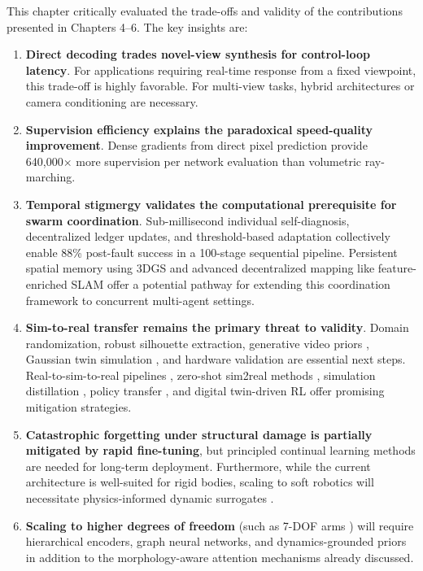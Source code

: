 \documentclass[12pt,a4paper,oneside]{report}
\begin{document}
This chapter critically evaluated the trade-offs and validity of the contributions presented in Chapters 4–6. The key insights are:

\begin{enumerate}
    \item \textbf{Direct decoding trades novel-view synthesis for control-loop latency}. For applications requiring real-time response from a fixed viewpoint, this trade-off is highly favorable. For multi-view tasks, hybrid architectures or camera conditioning are necessary.
    
    \item \textbf{Supervision efficiency explains the paradoxical speed-quality improvement}. Dense gradients from direct pixel prediction provide 640,000× more supervision per network evaluation than volumetric ray-marching.
    
    \item \textbf{Temporal stigmergy validates the computational prerequisite for swarm coordination}. Sub-millisecond individual self-diagnosis, decentralized ledger updates, and threshold-based adaptation collectively enable 88\% post-fault success in a 100-stage sequential pipeline. Persistent spatial memory using 3DGS \cite{lu2025gsmem} and advanced decentralized mapping like feature-enriched SLAM \cite{thirgood2025featureslam} offer a potential pathway for extending this coordination framework to concurrent multi-agent settings.
    
    \item \textbf{Sim-to-real transfer remains the primary threat to validity}. Domain randomization, robust silhouette extraction, generative video priors \cite{he2025vdreamer}, Gaussian twin simulation \cite{cai2025gausstwin}, and hardware validation are essential next steps. Real-to-sim-to-real pipelines \cite{torne2024rialto}, zero-shot sim2real methods \cite{qureshi2025splatsim, tang2025semantic}, simulation distillation \cite{levy2024simdist}, policy transfer \cite{jiang2024transic}, and digital twin-driven RL \cite{xu2025twinrl} offer promising mitigation strategies.
    
    \item \textbf{Catastrophic forgetting under structural damage is partially mitigated by rapid fine-tuning}, but principled continual learning methods are needed for long-term deployment. Furthermore, while the current architecture is well-suited for rigid bodies, scaling to soft robotics will necessitate physics-informed dynamic surrogates \cite{jiang2024phystwin}.
    
    \item \textbf{Scaling to higher degrees of freedom} (such as 7-DOF arms \cite{schulze2024high}) will require hierarchical encoders, graph neural networks, and dynamics-grounded priors \cite{rajeswaran2025embodiedynamics} in addition to the morphology-aware attention mechanisms \cite{patel2024getzero} already discussed.
\end{enumerate}
\end{document}

